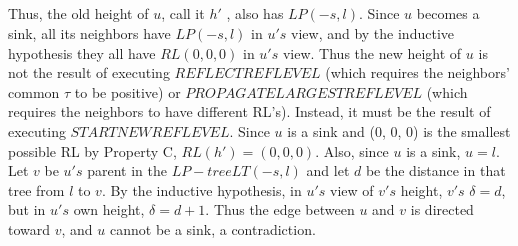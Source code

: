 \subparagraph{}Thus, the old height of $u$, call it $h'$ , also has $LP (-s, l)$. Since $u$ becomes a sink, all its neighbors have $LP (-s, l)$ in $u's$ view, and by the inductive hypothesis they all have $RL (0, 0, 0)$ in $u's$ view. Thus the new height of $u$ is not the result of executing $REFLECTREFLEVEL$ (which requires the neighbors' common $\tau$ to be positive) or $PROPAGATELARGESTREFLEVEL$ (which requires the neighbors to have different RL's). Instead, it must be the result of executing $STARTNEWREFLEVEL$. Since $u$ is a sink and (0, 0, 0) is the smallest possible RL by Property C, $RL(h' ) = (0, 0, 0)$. Also, since $u$ is a sink, $u = l$. Let $v$ be $u's$ parent in the $LP-tree LT (-s, l)$ and let $d$ be the distance in that tree from $l$ to $v$. By the inductive hypothesis, in $u's$ view of $v's$ height, $v's$ $\delta = d$, but in $u's$ own height, $\delta = d + 1$. Thus the edge between $u$ and $v$ is directed toward $v$, and $u$ cannot be a sink, a contradiction.
